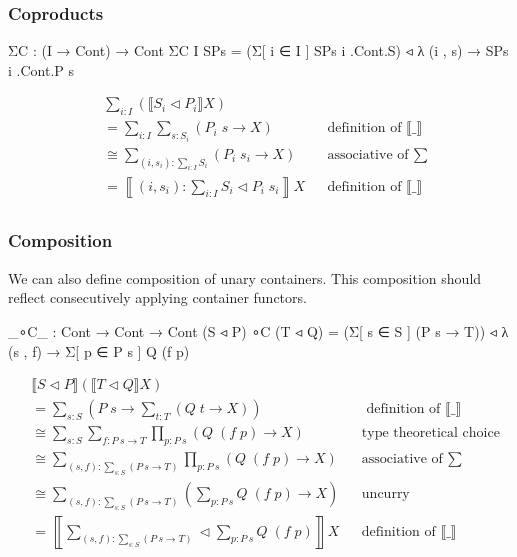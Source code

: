 \subsubsection*{Coproducts}

\begin{code}
ΣC : (I → Cont) → Cont
ΣC {I} SPs = (Σ[ i ∈ I ] SPs i .Cont.S) ◃ λ (i , s) → SPs i .Cont.P s
\end{code}

\begin{align*}
& \sum_{i : I} (\llbracket S_i \triangleleft P_i \rrbracket X) \\
&= \sum_{i : I} \sum_{s : S_i} (P_i \; s \rightarrow X) && \text{definition of $\llbracket \_ \rrbracket$} \\
&\cong \sum_{(i , s_i) : \sum_{i : I} S_i} (P_i \; s_i \rightarrow X) && \text{associative of $\sum$} \\
&= \left\llbracket (i , s_i) : \sum_{i : I} S_i \triangleleft P_i \; s_i \right\rrbracket X && \text{definition of $\llbracket \_ \rrbracket$} \\
\end{align*}

\subsubsection*{Composition}

We can also define composition of unary containers. This composition should reflect consecutively applying container functors.

\begin{code}
_∘C_ : Cont → Cont → Cont
(S ◃ P) ∘C (T ◃ Q) = (Σ[ s ∈ S ] (P s → T)) ◃ λ (s , f) → Σ[ p ∈ P s ] Q (f p)
\end{code}

\begin{align*}
& \llbracket S \triangleleft P \rrbracket (\llbracket T \triangleleft Q \rrbracket X) \\
&= \sum_{s : S} \left( P \; s \rightarrow \sum_{t : T} (Q \; t \rightarrow X) \right) && \text{ definition of $\llbracket \_ \rrbracket$} \\
&\cong \sum_{s : S} \sum_{f : P \: s \rightarrow T} \prod_{p : P \: s} (Q \; (f \; p) \rightarrow X) && \text{type theoretical choice} \\
&\cong \sum_{(s , f) : \sum_{s : S} ( P \: s \rightarrow T )} \prod_{p : P \: s} (Q \; (f \; p) \rightarrow X) && \text{associative of $\sum$} \\
&\cong \sum_{(s , f) : \sum_{s : S} ( P \: s \rightarrow T )} \left( \sum_{p : P \: s} Q \; (f \; p) \rightarrow X \right) && \text{uncurry} \\
&= \left\llbracket \sum_{(s , f) : \sum_{s : S} ( P \: s \rightarrow T )} \triangleleft \sum_{p : P \: s} Q \; (f \; p) \right\rrbracket X && \text{definition of $\llbracket \_ \rrbracket$} \\
\end{align*}

